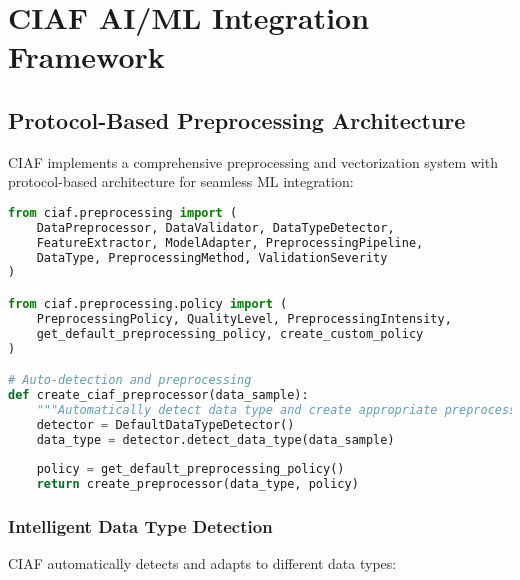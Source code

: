 \documentclass[12pt,a4paper]{article}
\begin{document}
\section{CIAF AI/ML Integration Framework}

\subsection{Protocol-Based Preprocessing Architecture}

CIAF implements a comprehensive preprocessing and vectorization system with protocol-based architecture for seamless ML integration:

\begin{lstlisting}[language=Python, caption=Preprocessing Protocol Architecture]
from ciaf.preprocessing import (
    DataPreprocessor, DataValidator, DataTypeDetector,
    FeatureExtractor, ModelAdapter, PreprocessingPipeline,
    DataType, PreprocessingMethod, ValidationSeverity
)

from ciaf.preprocessing.policy import (
    PreprocessingPolicy, QualityLevel, PreprocessingIntensity,
    get_default_preprocessing_policy, create_custom_policy
)

# Auto-detection and preprocessing
def create_ciaf_preprocessor(data_sample):
    """Automatically detect data type and create appropriate preprocessor."""
    detector = DefaultDataTypeDetector()
    data_type = detector.detect_data_type(data_sample)
    
    policy = get_default_preprocessing_policy()
    return create_preprocessor(data_type, policy)
\end{lstlisting}

\subsubsection{Intelligent Data Type Detection}

CIAF automatically detects and adapts to different data types:
\end{document}
